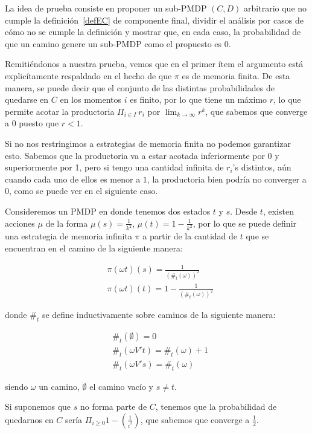 La idea de prueba consiste en proponer un sub-PMDP $(C, D)$ arbitrario que no
cumple la definición~\ref{defEC} de componente final, dividir el análisis por
casos de cómo no se cumple la definición y mostrar que, en cada caso, la
probabilidad de que un camino genere un sub-PMDP como el propuesto es 0.

Remitiéndonos a nuestra prueba, vemos que en el primer ítem el argumento está explicítamente respaldado en el hecho de que $\pi$ es de memoria finita. De esta manera, se puede decir que el conjunto de las distintas probabilidades de quedarse en $C$ en los momentos $i$ es finito, por lo que tiene un máximo $r$, lo que permite acotar la productoria $\Pi_{i \in I} \ r_i$ por $\lim_{k \to \infty} r^k$, que sabemos que converge a 0 puesto que $r < 1$.

Si no nos restringimos a estrategias de memoria finita no podemos garantizar
esto. Sabemos que la productoria va a estar acotada inferiormente por 0 y
superiormente por 1, pero si tengo una cantidad infinita de $r_i$'s distintos, aún cuando cada uno de ellos es menor a $1$, la productoria bien podría no converger a $0$, como se puede ver en el siguiente caso.

Consideremos un PMDP en donde tenemos dos estados $t$ y $s$. Desde $t$, existen acciones $\mu$ de la forma $\mu(s) =
	\frac{1}{k^2}$, $\mu(t) = 1 - \frac{1}{k^2}$, por lo que se puede definir una
estrategia de memoria infinita $\pi$ a partir de la cantidad de $t$ que se
encuentran en el camino de la siguiente manera:

\begin{align*}
	&\pi(\omega t)(s) = \frac{1}{(\#_t(\omega))^2} \\
	&\pi(\omega t)(t) = 1- \frac{1}{(\#_t(\omega))^2}
\end{align*}

donde $\#_t$ se define inductivamente sobre caminos de la siguiente manera:

\begin{align*}
	&\#_t(\emptyset) = 0 \\
	&\#_t(\omega V' t) = \#_t(\omega) + 1 \\
	&\#_t(\omega V' s) = \#_t(\omega)
\end{align*}

siendo $\omega$ un camino, $\emptyset$ el camino vacío y $s \neq t$.

Si suponemos que $s$ no forma parte de $C$, tenemos que la probabilidad de quedarnos en $C$ sería
$\Pi_{i \geq 0} 1-(\frac{1}{i^2})$, que sabemos que converge a $\frac{1}{2}$.

